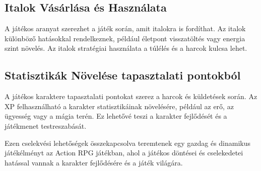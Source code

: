 \subsection{Italok Vásárlása és Használata}

\indent \indent A játékos aranyat szerezhet a játék során, amit italokra is fordíthat. Az italok különböző hatásokkal rendelkeznek, például életpont visszatöltés vagy energia szint növelés. Az italok stratégiai használata a túlélés és a harcok kulcsa lehet.

\subsection{Statisztikák Növelése tapasztalati pontokból}

\indent \indent A játékos karaktere tapasztalati pontokat szerez a harcok és küldetések során. Az XP felhasználható a karakter statisztikáinak növelésére, például az erő, az ügyesség vagy a mágia terén. Ez lehetővé teszi a karakter fejlődését és a játékmenet testreszabását.

Ezen cselekvési lehetőségek összekapcsolva teremtenek egy gazdag és dinamikus játékélményt az Action RPG játékban, ahol a játékos döntései és cselekedetei hatással vannak a karakter fejlődésére és a játék világára.



